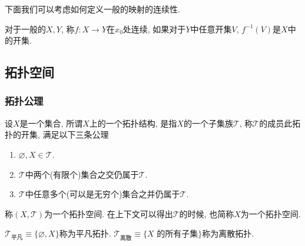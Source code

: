 下面我们可以考虑如何定义一般的映射的连续性.
\begin{definition}
    对于一般的$X, Y$, 称$f\colon X \to Y$在$x_0$处连续, 如果对于$Y$中任意开集$V$, $f^{-1} \left( V \right) $是$X$中的开集.
\end{definition}

\subsection{拓扑空间}
\subsubsection{拓扑公理}
\begin{definition}
    设$X$是一个集合, 所谓$X$上的一个拓扑结构, 是指$X$的一个子集族$\mathscr{T}$, 称$\mathscr{T}$的成员此拓扑的开集, 满足以下三条公理
    \begin{enumerate}
        \item $\varnothing, X \in \mathscr{T}$.
        \item $\mathscr{T}$中两个(有限个)集合之交仍属于$\mathscr{T}$.
        \item $\mathscr{T}$中任意多个(可以是无穷个)集合之并仍属于$\mathscr{T}$.
    \end{enumerate}
    称$\left( X , \mathscr{T}\right) $为一个拓扑空间. 在上下文可以得出$\mathscr{T}$的时候, 也简称$X$为一个拓扑空间.
\end{definition}

\begin{example}
    $\mathscr{T}_{\text{平凡}} \equiv \{ \varnothing, X \}$称为平凡拓扑.
    $\mathscr{T}_{\text{离散}} \equiv \{ X \text{ 的所有子集} \} $称为离散拓扑.
\end{example}

